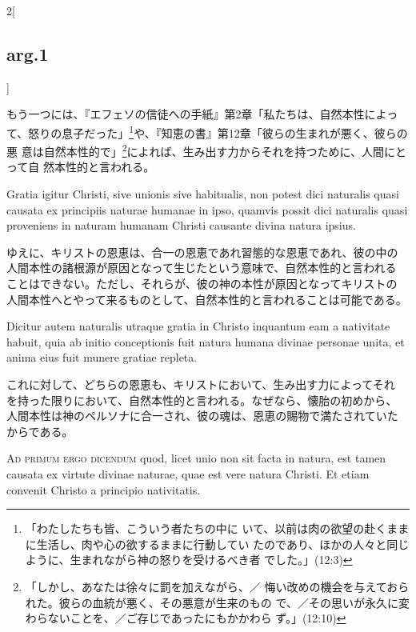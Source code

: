 \documentclass[paper=a4paper,fontsize=10pt,jafontsize=9pt,titlepage]{jlreq}
\begin{document}
\begin{paracol}{2}[\subsection{arg.1}]
\switchcolumn

もう一つには、『エフェソの信徒への手紙』第2章「私たちは、自然本性によっ
て、怒りの息子だった」\footnote{「わたしたちも皆、こういう者たちの中に
いて、以前は肉の欲望の赴くままに生活し、肉や心の欲するままに行動してい
たのであり、ほかの人々と同じように、生まれながら神の怒りを受けるべき者
でした。」(12:3)}や、『知恵の書』第12章「彼らの生まれが悪く、彼らの悪
意は自然本性的で」\footnote{「しかし、あなたは徐々に罰を加えながら、／
悔い改めの機会を与えておられた。彼らの血統が悪く、その悪意が生来のもの
で、／その思いが永久に変わらないことを、／ご存じであったにもかかわら
ず。」(12:10)}によれば、生み出す力からそれを持つために、人間にとって自
然本性的と言われる。

\switchcolumn*

Gratia igitur Christi, sive unionis sive habitualis, non potest dici
naturalis quasi causata ex principiis naturae humanae in ipso, quamvis
possit dici naturalis quasi proveniens in naturam humanam Christi
causante divina natura ipsius.

\switchcolumn

ゆえに、キリストの恩恵は、合一の恩恵であれ習態的な恩恵であれ、彼の中の
人間本性の諸根源が原因となって生じたという意味で、自然本性的と言われる
ことはできない。ただし、それらが、彼の神の本性が原因となってキリストの
人間本性へとやって来るものとして、自然本性的と言われることは可能である。

\switchcolumn*

Dicitur autem naturalis utraque gratia in Christo inquantum eam a
nativitate habuit, quia ab initio conceptionis fuit natura humana
divinae personae unita, et anima eius fuit munere gratiae repleta.

\switchcolumn

これに対して、どちらの恩恵も、キリストにおいて、生み出す力によってそれ
を持った限りにおいて、自然本性的と言われる。なぜなら、懐胎の初めから、
人間本性は神のペルソナに合一され、彼の魂は、恩恵の賜物で満たされていた
からである。

\switchcolumn*[\subsection{ad.1}]

{\scshape Ad primum ergo dicendum} quod, licet unio non sit facta in
natura, est tamen causata ex virtute divinae naturae, quae est vere
natura Christi. Et etiam convenit Christo a principio nativitatis.

\switchcolumn


\end{paracol}
\end{document}
